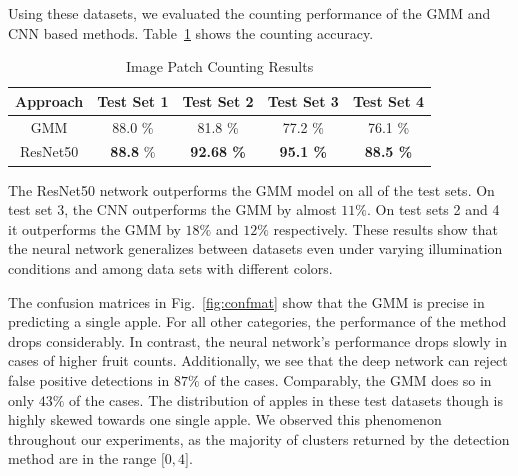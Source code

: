 Using these datasets, we evaluated the counting performance of the GMM and CNN based methods. Table~\ref{tab:1} shows the counting accuracy.

\begin{table}[h!]
    \begin{center}
        \caption{Image Patch Counting Results}
        \label{tab:1}
        \begin{tabular}{|c|c|c|c|c|}
            \hline
            \textbf{Approach} & \textbf{Test Set 1} & \textbf{Test Set 2} & \textbf{Test Set 3} & \textbf{Test Set 4}\\
            \hline
            GMM & 88.0 \% & 81.8 \% & 77.2 \% & 76.1 \% \\
            \hline
            ResNet50 & \textbf{88.8} \% & \textbf{92.68 \%} & \textbf{95.1 \%} & \textbf{88.5 \%}\\
            \hline
        \end{tabular}
    \end{center}
\end{table}

The ResNet50 network outperforms the GMM model on all of the test sets. On test set 3, the CNN outperforms the GMM by almost $11\%$. On test sets 2 and 4 it outperforms the GMM by $18\%$ and $12\%$ respectively. These results show that the neural network generalizes between datasets even under varying illumination conditions and among data sets with different colors.


The confusion matrices in Fig.~\ref{fig:confmat} show that the GMM is precise in predicting a single apple. For all other categories, the performance of the method drops considerably. In contrast, the neural network's performance drops slowly in cases of higher fruit counts. Additionally, we see that the deep network can reject false positive detections in $87\%$ of the cases. Comparably, the GMM does so in only $43\%$ of the cases. The distribution of apples in these test datasets though is highly skewed towards one single apple. We observed this phenomenon throughout our experiments, as the majority of clusters returned by the detection method are in the range $\lbrack 0, 4 \rbrack$. 

